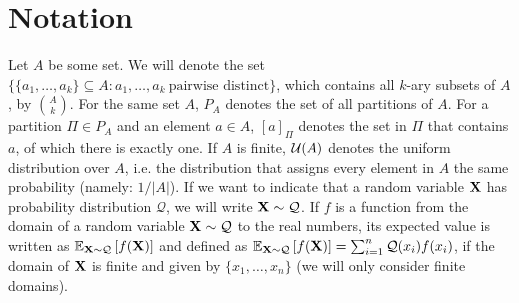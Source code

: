 \section{Notation}
Let $A$ be some set. We will denote the set $\{ \{ a_1, \dots, a_k \} \subseteq A : a_1,\dots,a_k\ \text{pairwise distinct}\}$, which contains all $k$-ary subsets of $A$, by $\binom{A}{k}$. For the same set $A$, $P_A$ denotes the set of all partitions of $A$. For a partition $\Pi \in P_A$ and an element $a \in A$, $[a]_\Pi$ denotes the set in $\Pi$ that contains $a$, of which there is exactly one. If $A$ is finite, $\mathcal{U}(A)$ denotes the uniform distribution over $A$, i.e. the distribution that assigns every element in $A$ the same probability (namely: $1/|A|$). If we want to indicate that a random variable ${\bf X}$ has probability distribution $\mathcal{Q}$, we will write ${\bf X} \sim \mathcal{Q}$. If $f$ is a function from the domain of a random variable ${\bf X} \sim \mathcal{Q}$ to the real numbers, its expected value is written as $\mathbb{E}_{{\bf X} \sim \mathcal{Q}}\left[f({\bf X})\right]$ and defined as $\mathbb{E}_{{\bf X} \sim \mathcal{Q}} \left[f({\bf X})\right] = \sum_{i=1}^n \mathcal{Q}(x_i) f(x_i)$, if the domain of ${\bf X}$ is finite and given by $\{x_1,\dots,x_n\}$ (we will only consider finite domains).

